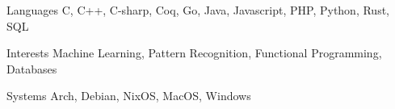 
\begin{cvskills}
  \cvskill
    {Languages}
    {C, C++, C-sharp, Coq, Go, Java, Javascript, PHP, Python, Rust, SQL}

  \cvskill
    {Interests}
    {Machine Learning, Pattern Recognition, Functional Programming, Databases}

  \cvskill
    {Systems}
    {Arch, Debian, NixOS, MacOS, Windows}
\end{cvskills}

